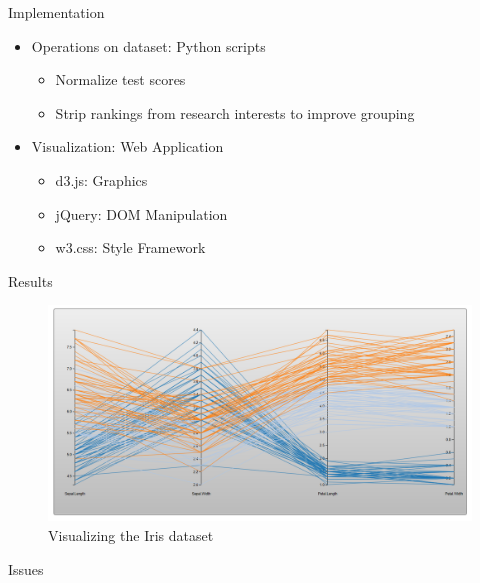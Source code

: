 \documentclass{beamer}
\begin{document}
	\begin{frame}{Implementation}
		\begin{itemize}
			\item Operations on dataset: Python scripts
			\begin{itemize}
				\item Normalize test scores
				\item Strip rankings from research interests to improve grouping
			\end{itemize}
			\item Visualization: Web Application
			\begin{itemize}
				\item d3.js: Graphics
				\item jQuery: DOM Manipulation
				\item w3.css: Style Framework
			\end{itemize}
		\end{itemize}
	\end{frame}
	
	\begin{frame}{Results}
		\begin{figure}[h]
			\includegraphics[width=\linewidth]{results.png}
			\caption{Visualizing the Iris dataset}
			\label{fig:Result}
		\end{figure}		
	\end{frame}
	
	\begin{frame}{Issues}
		
	\end{frame}
\end{document}
